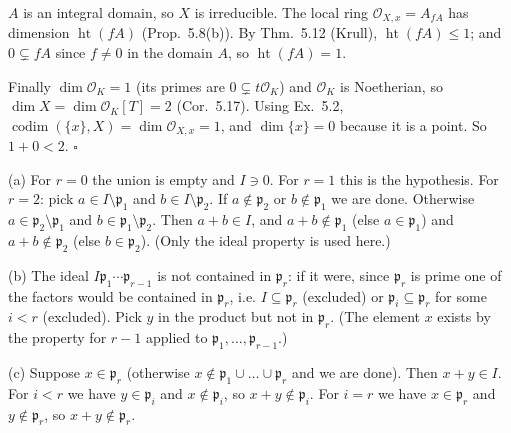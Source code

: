 \documentclass[11pt]{article}
\begin{document}
$A$ is an integral domain, so $X$ is irreducible. The local ring $\mathcal O_{X,x}=A_{fA}$ has dimension $\operatorname{ht}(fA)$ (Prop.~5.8(b)). By Thm.~5.12 (Krull), $\operatorname{ht}(fA)\le1$; and $0\subsetneq fA$ since $f\neq0$ in the domain $A$, so $\operatorname{ht}(fA)=1$.

Finally $\dim\mathcal O_K=1$ (its primes are $0\subsetneq t\mathcal O_K$) and $\mathcal O_K$ is Noetherian, so $\dim X=\dim\mathcal O_K[T]=2$ (Cor.~5.17). Using Ex.~5.2, $\operatorname{codim}(\{x\},X)=\dim\mathcal O_{X,x}=1$, and $\dim\{x\}=0$ because it is a point. So $1+0<2$. \hfill$\square$

\pf
(a) For $r=0$ the union is empty and $I\ni0$. For $r=1$ this is the hypothesis. For $r=2$: pick $a\in I\setminus\mathfrak p_1$ and $b\in I\setminus\mathfrak p_2$. If $a\notin\mathfrak p_2$ or $b\notin\mathfrak p_1$ we are done. Otherwise $a\in\mathfrak p_2\setminus\mathfrak p_1$ and $b\in\mathfrak p_1\setminus\mathfrak p_2$. Then $a+b\in I$, and $a+b\notin\mathfrak p_1$ (else $a\in\mathfrak p_1$) and $a+b\notin\mathfrak p_2$ (else $b\in\mathfrak p_2$). (Only the ideal property is used here.)

(b) The ideal $I\mathfrak p_1\cdots\mathfrak p_{r-1}$ is not contained in $\mathfrak p_r$: if it were, since $\mathfrak p_r$ is prime one of the factors would be contained in $\mathfrak p_r$, i.e. $I\subseteq\mathfrak p_r$ (excluded) or $\mathfrak p_i\subseteq\mathfrak p_r$ for some $i<r$ (excluded). Pick $y$ in the product but not in $\mathfrak p_r$. (The element $x$ exists by the property for $r-1$ applied to $\mathfrak p_1,\dots,\mathfrak p_{r-1}$.)

(c) Suppose $x\in\mathfrak p_r$ (otherwise $x\notin\mathfrak p_1\cup\dots\cup\mathfrak p_r$ and we are done). Then $x+y\in I$. For $i<r$ we have $y\in\mathfrak p_i$ and $x\notin\mathfrak p_i$, so $x+y\notin\mathfrak p_i$. For $i=r$ we have $x\in\mathfrak p_r$ and $y\notin\mathfrak p_r$, so $x+y\notin\mathfrak p_r$.
\end{document}
